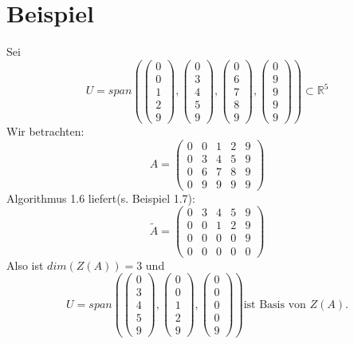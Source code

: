 \documentclass{scrbook}
\begin{document}
\section{Beispiel}
Sei
\[
U =span
\left(
\left(
\begin{array}{c}
0\\0\\1\\2\\9
\end{array}
\right),
\left(
\begin{array}{c}
0\\3\\4\\5\\9
\end{array}
\right),
\left(
\begin{array}{c}
0\\6\\7\\8\\9
\end{array}
\right),
\left(
\begin{array}{c}
0\\9\\9\\9\\9
\end{array}
\right)
\right) \subset \mathbb{R}^5
\]
Wir betrachten:
\[
A=
\left(
\begin{array}{ccccc}
0&0&1&2&9\\
0&3&4&5&9\\
0&6&7&8&9\\
0&9&9&9&9
\end{array}
\right)
\]
Algorithmus 1.6 liefert(s. Beispiel 1.7):
\[
\tilde{A}=
\left(
\begin{array}{ccccc}
0&3&4&5&9\\
0&0&1&2&9\\
0&0&0&0&9\\
0&0&0&0&0
\end{array}
\right)
\]
Also ist $dim(Z(A))=3$ und 
\[
U =span
\left(
\left(
\begin{array}{c}
0\\3\\4\\5\\9
\end{array}
\right),
\left(
\begin{array}{c}
0\\0\\1\\2\\9
\end{array}
\right),
\left(
\begin{array}{c}
0\\0\\0\\0\\9
\end{array}
\right)\right) \text{ist Basis von }Z(A).
\]
\end{document}
